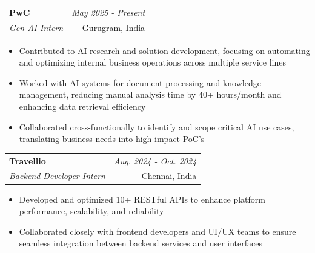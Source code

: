 \documentclass[a4paper,11pt]{article}
\makeatletter
\newcommand{\resumeSubheading}[4]{
\vspace{0.5mm}\item
    \begin{tabular*}{0.98\textwidth}[t]{l@{\extracolsep{\fill}}r}
        \textbf{#1} & \textit{\footnotesize{#4}} \\
        \textit{\footnotesize{#3}} &  \footnotesize{#2}\\
    \end{tabular*}
    \vspace{-2.4mm}
}
\newcommand{\resumeItemListStart}{\begin{justify}\begin{itemize}[leftmargin=3ex, rightmargin=2ex, noitemsep,labelsep=1.2mm,itemsep=0mm]\small}
\newcommand{\resumeItemListEnd}{\end{itemize}\end{justify}\vspace{-2mm}}
\makeatother
\begin{document}

    \resumeSubheading
      {PwC}{Gurugram, India}
      {Gen AI Intern}{May 2025 - Present}
      \resumeItemListStart
    \item {Contributed to AI research and solution development, focusing on automating and optimizing internal business operations across multiple service lines}
    \item {Worked with AI systems for document processing and knowledge management, reducing manual analysis time by 40+ hours/month and enhancing data retrieval efficiency}
    \item {Collaborated cross-functionally to identify and scope critical AI use cases, translating business needs into high-impact PoC's}
    \resumeItemListEnd

        \resumeSubheading
      {Travellio}{Chennai, India}
      {Backend Developer Intern}{Aug. 2024 - Oct. 2024}
      \resumeItemListStart
    \item {Developed and optimized 10+ RESTful APIs to enhance platform performance, scalability, and reliability}
    \item {Collaborated closely with frontend developers and UI/UX teams to ensure seamless integration between backend services and user interfaces}
    \resumeItemListEnd
    
\end{document}

